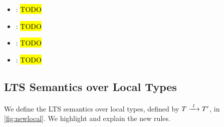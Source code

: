 \begin{figure}[!h]
\begin{prooftree}
\end{prooftree}

\label{fig:newglobal}
\end{figure}

\begin{itemize}

\item {}: 
\hl{TODO}

\item {}:
\hl{TODO}

\item {}:
\hl{TODO}

\item {}:
\hl{TODO}

\end{itemize}

\subsection{LTS Semantics over Local Types}
\label{subsection:newltslocal}

We define the LTS semantics 
over local types,
defined by $\treduce{T}{T'}{l}$,
in \cref{fig:newlocal}.
We highlight and explain the new rules.

